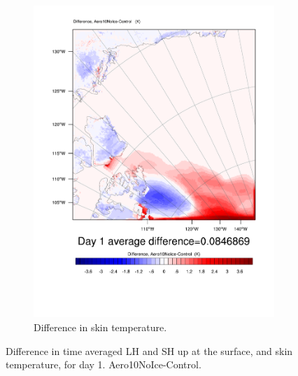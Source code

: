 \begin{figure}
	\begin{subfigure}{0.48\textwidth}
		\includegraphics[width=\textwidth]{results/aero10ni/diff_Aero10NoIce_TSK_Day1.pdf}
		\caption{Difference in skin temperature.}
		\label{subfig:skin_r4Day1}
	\end{subfigure}
	\caption{Difference in time averaged LH and SH up at the surface, and skin temperature, for day 1. Aero10NoIce-Control.}
	\label{fig:lhshskin_r4Day1}
\end{figure}

\clearpage
